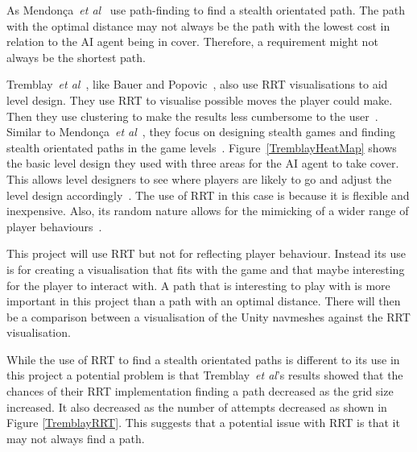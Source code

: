 \documentclass[journal]{IEEEtran}
\begin{document}
As Mendonça~\textit{et al}~\cite{Mendonça2015} use path-finding to find a stealth orientated path. The path with the optimal distance may not always be the path with the lowest cost in relation to the AI agent being in cover. Therefore, a requirement might not always be the shortest path. 

Tremblay~\textit{et al}~\cite{Tremblay2013}, like Bauer and Popovic~\cite{bauer2012}, also use RRT visualisations to aid level design. They use RRT to visualise possible moves the player could make. Then they use clustering to make the results less cumbersome to the user~\cite{Tremblay2013}. Similar to Mendonça~\textit{et al}~\cite{Mendonça2015}, they focus on designing stealth games and finding stealth orientated paths in the game levels~\cite{Tremblay2013}.   Figure~\ref{TremblayHeatMap} shows the basic level design they used with three areas for the AI agent to take cover. This allows level designers to see where players are likely to go and adjust the level design accordingly~\cite{Tremblay2013}.  The use of RRT in this case is because it is flexible and inexpensive. Also, its random nature allows for the mimicking of a wider range of player behaviours~\cite{Tremblay2013}. 

This project will use RRT but not for reflecting player behaviour.  Instead its use is for creating a visualisation that fits with the game and that maybe interesting for the player to interact with. A path that is interesting to play with is more important in this project than a path with an optimal distance. There will then be a comparison between a visualisation of the Unity navmeshes against the RRT visualisation.

While the use of RRT to find a stealth orientated paths is different to its use in this project a potential problem is that Tremblay~\textit{et al}'s results showed that the chances of their RRT implementation finding a path decreased as the grid size increased. It also decreased as the number of attempts decreased as shown in Figure \ref{TremblayRRT}.  This suggests that a potential issue with RRT is that it may not always find a path.
\end{document}
